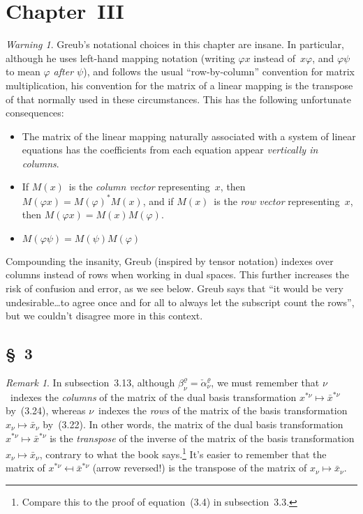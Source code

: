 \documentclass[letterpaper,12pt]{article}
\theoremstyle{definition}
\theoremstyle{remark}
\newtheorem*{rmk}{Remark}
\newtheorem*{warn}{Warning}
\begin{document}
\section*{Chapter~III}
\begin{warn}
Greub's notational choices in this chapter are insane. In particular, although he uses left-hand mapping notation (writing \(\varphi x\) instead of~\(x\varphi\), and \(\varphi\psi\) to mean \emph{\(\varphi\) after \(\psi\)}), and follows the usual ``row-by-column'' convention for matrix multiplication, his convention for the matrix of a linear mapping is the transpose of that normally used in these circumstances. This has the following unfortunate consequences:
\begin{itemize}
\item The matrix of the linear mapping naturally associated with a system of linear equations has the coefficients from each equation appear \emph{vertically in columns}.
\item If \(M(x)\)~is the \emph{column vector} representing~\(x\), then \(M(\varphi x)=M(\varphi)^*M(x)\), and if \(M(x)\)~is the \emph{row vector} representing~\(x\), then \(M(\varphi x)=M(x)M(\varphi)\).
\item \(M(\varphi\psi)=M(\psi)M(\varphi)\)
\end{itemize}
Compounding the insanity, Greub (inspired by tensor notation) indexes over columns instead of rows when working in dual spaces. This further increases the risk of confusion and error, as we see below. Greub says that ``it would be very undesirable\dots to agree once and for all to always let the subscript count the rows'', but we couldn't disagree more in this context.
\end{warn}

\subsection*{\S~3}
\begin{rmk}
In subsection~3.13, although \(\beta^{\varrho}_{\nu}=\check{\alpha}_{\nu}^{\varrho}\), we must remember that \(\nu\)~indexes the \emph{columns} of the matrix of the dual basis transformation \(x^{*\nu}\mapsto\bar{x}^{*\nu}\) by~(3.24), whereas \(\nu\)~indexes the \emph{rows} of the matrix of the basis transformation \(x_{\nu}\mapsto\bar{x}_{\nu}\) by~(3.22). In other words, the matrix of the dual basis transformation \(x^{*\nu}\mapsto\bar{x}^{*\nu}\) is the \emph{transpose} of the inverse of the matrix of the basis transformation \(x_{\nu}\mapsto\bar{x}_{\nu}\), contrary to what the book says.\footnote{Compare this to the proof of equation~(3.4) in subsection~3.3.} It's easier to remember that the matrix of \(x^{*\nu}\mapsfrom\bar{x}^{*\nu}\) (arrow reversed!) is the transpose of the matrix of \(x_{\nu}\mapsto\bar{x}_{\nu}\).
\end{rmk}
\end{document}
